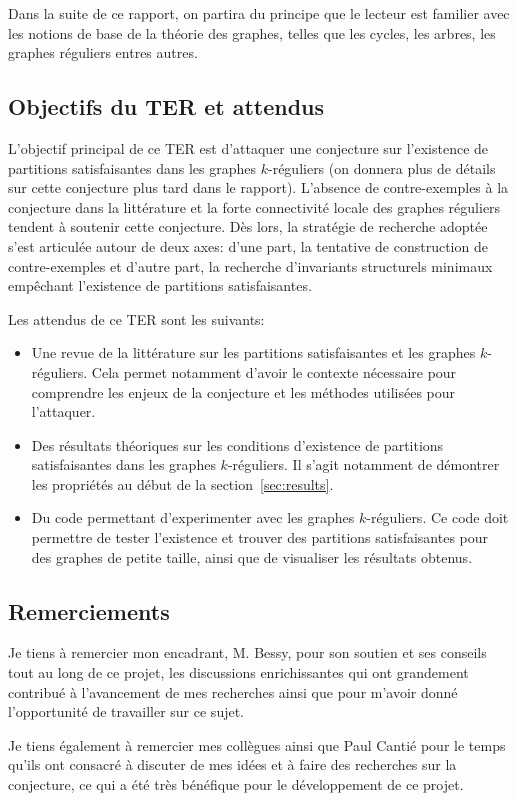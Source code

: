 Dans la suite de ce rapport, on partira du principe que le lecteur est familier avec les notions de base de la théorie des graphes, telles que les cycles, les arbres, les graphes réguliers entres autres.

\subsection{Objectifs du TER et attendus}

L'objectif principal de ce TER est d'attaquer une conjecture sur l'existence de partitions satisfaisantes dans les graphes \(k\)-réguliers (on donnera plus de détails sur cette conjecture plus tard dans le rapport).
L'absence de contre-exemples à la conjecture dans la littérature et la forte connectivité locale des graphes réguliers tendent à soutenir cette conjecture. 
Dès lors, la stratégie de recherche adoptée s'est articulée autour de deux axes: d'une part, la tentative de construction de contre-exemples et d'autre part, la recherche d'invariants structurels minimaux empêchant l'existence de partitions satisfaisantes.

Les attendus de ce TER sont les suivants:
\begin{itemize}
    \item Une revue de la littérature sur les partitions satisfaisantes et les graphes \(k\)-réguliers.
    Cela permet notamment d'avoir le contexte nécessaire pour comprendre les enjeux de la conjecture et les méthodes utilisées pour l'attaquer.
    \item Des résultats théoriques sur les conditions d'existence de partitions satisfaisantes dans les graphes \(k\)-réguliers.
    Il s'agit notamment de démontrer les propriétés au début de la section~\ref{sec:results}. %
    \item Du code permettant d'experimenter avec les graphes \(k\)-réguliers.
    Ce code doit permettre de tester l'existence et trouver des partitions satisfaisantes pour des graphes de petite taille, ainsi que de visualiser les résultats obtenus.
\end{itemize}

\subsection{Remerciements}

Je tiens à remercier mon encadrant, M. Bessy, pour son soutien et ses conseils tout au long de ce projet, les discussions enrichissantes qui ont grandement contribué à l'avancement de mes recherches ainsi que pour m'avoir donné l'opportunité de travailler sur ce sujet.

Je tiens également à remercier mes collègues ainsi que Paul Cantié pour le temps qu'ils ont consacré à discuter de mes idées et à faire des recherches sur la conjecture, ce qui a été très bénéfique pour le développement de ce projet.

